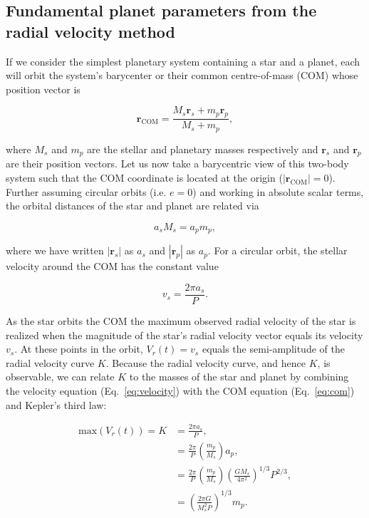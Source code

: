 \subsection{Fundamental planet parameters from the radial velocity method} \label{sect:K}
If we consider the simplest planetary system containing a star and a planet, each will 
orbit the system's barycenter or their common centre-of-mass (COM) whose position vector
is

\begin{equation}
\mathbf{r}_{\mathrm{COM}} = \frac{M_s \mathbf{r}_s + m_p \mathbf{r}_p}{M_s + m_p},
\end{equation}

\noindent where $M_s$ and $m_p$ are the stellar and planetary masses respectively and
$\mathbf{r}_s$ and $\mathbf{r}_p$ are their position vectors. 
Let us now take a barycentric view of this two-body system such that the 
COM coordinate is located at the origin ($|\mathbf{r}_{\mathrm{COM}}|=0$). Further
assuming circular orbits (i.e. $e=0$) and working 
in absolute scalar terms, the orbital distances of the star and planet are  
related via 

\begin{equation}
a_s M_s = a_p m_p,
\label{eq:com}
\end{equation}
  
\noindent where we have written $|\mathbf{r}_s|$ as $a_s$ and 
$|\mathbf{r}_p|$ as $a_p$. For a circular orbit, the stellar velocity around the COM has
the constant value

\begin{equation}
v_s = \frac{2\pi a_s}{P}.
\label{eq:velocity}
\end{equation}

\noindent As the star orbits the COM the maximum observed radial velocity of the star
is realized when the magnitude of the star's radial velocity vector
equals its velocity $v_s$. At these points in the orbit, $V_r(t)=v_s$ equals the semi-amplitude 
of the radial velocity curve $K$. Because the radial velocity 
curve, and hence $K$, is observable, 
we can relate $K$ to the masses of the star and planet by combining the velocity 
equation (Eq.~\ref{eq:velocity}) with the COM equation (Eq.~\ref{eq:com})
and Kepler's third law:

\begin{align}
\mathrm{max}(V_r(t)) = K &= \frac{2\pi a_s}{P}, \\
&= \frac{2\pi}{P} \left( \frac{m_p}{M_s} \right) a_p, \\
&= \frac{2\pi}{P} \left( \frac{m_p}{M_s} \right) \left( \frac{GM_s}{4\pi^2} \right)^{1/3} P^{2/3}, \\
&= \left( \frac{2\pi G}{M_s^2 P} \right)^{1/3} m_p. \label{eq:K1}
\end{align}

